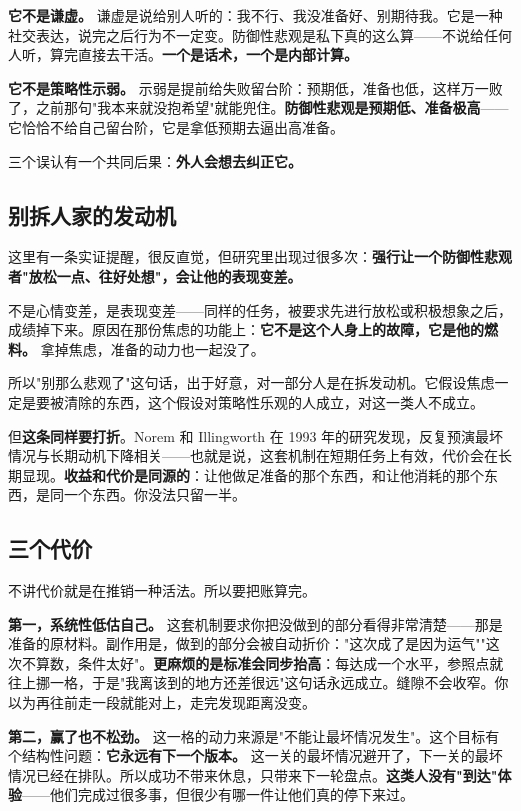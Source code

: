 \documentclass[11pt,a4paper]{ctexart}
\begin{document}
\textbf{它不是谦虚。} 谦虚是说给别人听的：我不行、我没准备好、别期待我。它是一种社交表达，说完之后行为不一定变。防御性悲观是私下真的这么算——不说给任何人听，算完直接去干活。\textbf{一个是话术，一个是内部计算。}

\textbf{它不是策略性示弱。} 示弱是提前给失败留台阶：预期低，准备也低，这样万一败了，之前那句"我本来就没抱希望"就能兜住。\textbf{防御性悲观是预期低、准备极高}——它恰恰不给自己留台阶，它是拿低预期去逼出高准备。

三个误认有一个共同后果：\textbf{外人会想去纠正它。}

\subsection{别拆人家的发动机}

这里有一条实证提醒，很反直觉，但研究里出现过很多次：\textbf{强行让一个防御性悲观者"放松一点、往好处想"，会让他的表现变差。}

不是心情变差，是表现变差——同样的任务，被要求先进行放松或积极想象之后，成绩掉下来。原因在那份焦虑的功能上：\textbf{它不是这个人身上的故障，它是他的燃料。} 拿掉焦虑，准备的动力也一起没了。

所以"别那么悲观了"这句话，出于好意，对一部分人是在拆发动机。它假设焦虑一定是要被清除的东西，这个假设对策略性乐观的人成立，对这一类人不成立。

但\textbf{这条同样要打折}。Norem 和 Illingworth 在 1993 年的研究发现，反复预演最坏情况与长期动机下降相关——也就是说，这套机制在短期任务上有效，代价会在长期显现。\textbf{收益和代价是同源的}：让他做足准备的那个东西，和让他消耗的那个东西，是同一个东西。你没法只留一半。

\subsection{三个代价}

不讲代价就是在推销一种活法。所以要把账算完。

\textbf{第一，系统性低估自己。} 这套机制要求你把没做到的部分看得非常清楚——那是准备的原材料。副作用是，做到的部分会被自动折价："这次成了是因为运气""这次不算数，条件太好"。\textbf{更麻烦的是标准会同步抬高}：每达成一个水平，参照点就往上挪一格，于是"我离该到的地方还差很远"这句话永远成立。缝隙不会收窄。你以为再往前走一段就能对上，走完发现距离没变。

\textbf{第二，赢了也不松劲。} 这一格的动力来源是"不能让最坏情况发生"。这个目标有个结构性问题：\textbf{它永远有下一个版本。} 这一关的最坏情况避开了，下一关的最坏情况已经在排队。所以成功不带来休息，只带来下一轮盘点。\textbf{这类人没有"到达"体验}——他们完成过很多事，但很少有哪一件让他们真的停下来过。
\end{document}
